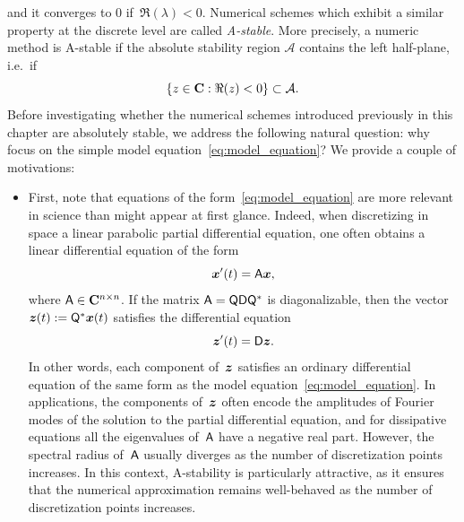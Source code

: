 and it converges to $0$ if~$\Re(\lambda) < 0$.
Numerical schemes which exhibit a similar property at the discrete level are called \emph{A-stable}.
More precisely, a numeric method is A-stable if the absolute stability region $\mathcal A$ contains the left half-plane,
i.e.\ if
\[
    \{ z \in \mathbf C : \Re(z) < 0 \} \subset \mathcal A.
\]
Before investigating whether the numerical schemes introduced previously in this chapter are absolutely stable,
we address the following natural question:
why focus on the simple model equation~\eqref{eq:model_equation}?
We provide a couple of motivations:
\begin{itemize}
    \item
        First, note that equations of the form~\eqref{eq:model_equation} are more relevant in science than might appear at first glance.
        Indeed, when discretizing in space a linear parabolic partial differential equation,
        one often obtains a linear differential equation of the form
        \[
            \mathbf{\boldsymbol{x}}'(t) = \mathsf A \mathbf{\boldsymbol{x}},
        \]
        where $\mathsf A \in \mathbf C^{n \times n}$.
        If the matrix $\mathsf A = \mathsf Q \mathsf D \mathsf Q^*$ is diagonalizable,
        then the vector $\mathbf{\boldsymbol{z}}(t) := \mathsf Q^* \mathbf{\boldsymbol{x}}(t)$ satisfies the differential equation
        \[
            \mathbf{\boldsymbol{z}}'(t) = \mathsf D \mathbf{\boldsymbol{z}}.
        \]
        In other words, each component of~$\mathbf{\boldsymbol{z}}$ satisfies an ordinary differential equation of the same form as the model equation~\eqref{eq:model_equation}.
        In applications, the components of~$\mathbf{\boldsymbol{z}}$ often encode the amplitudes of Fourier modes of the solution to the partial differential equation,
        and for dissipative equations all the eigenvalues of~$\mathsf A$ have a negative real part.
        However, the spectral radius of~$\mathsf A$ usually diverges as the number of discretization points increases.
        In this context, A-stability is particularly attractive,
        as it ensures that the numerical approximation remains well-behaved as the number of discretization points increases.


\end{itemize}
